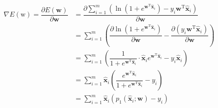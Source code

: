 \documentclass{article}
\begin{document}
\begin{equation*}
    \begin{aligned}
        \nabla E(\mathrm{w})=\dfrac{\partial E(\mathbf{w})}{\partial \mathbf{w}} & =\dfrac{\partial \sum_{i=1}^m\left(\ln \left(1+e^{\mathbf{w}^{\mathrm{T}} \hat{\boldsymbol{x}}_i}\right) - y_i \mathbf{w}^{\mathrm{T}} \hat{\boldsymbol{x}}_i\right)}{\partial \mathbf{w}} \\
        & =\sum_{i=1}^m\left(\dfrac{\partial \ln \left(1+e^{\mathbf{w}^{\mathrm{T}} \hat{\boldsymbol{x}}_i}\right)}{\partial \mathbf{w}}-\dfrac{\partial\left(y_i \mathbf{w}^{\mathrm{T}} \hat{\boldsymbol{x}}_i\right)}{\partial \mathbf{w}}\right) \\
        & =\sum_{i=1}^m\left(\dfrac{1}{1+e^{\mathbf{w}^{\mathrm{T}} \hat{\boldsymbol{x}}_i}} \cdot \hat{\boldsymbol{x}}_i e^{\mathbf{w}^{\mathrm{T}} \hat{\boldsymbol{x}}_i}-y_i \hat{\boldsymbol{x}}_i\right) \\
        & =\sum_{i=1}^m \hat{\boldsymbol{x}}_i\left(\dfrac{e^{\mathbf{w}^{\mathrm{T}} \hat{\boldsymbol{x}}_i}}{1+e^{\mathbf{w}^{\mathrm{T}} \hat{\boldsymbol{x}}_i}}-y_i\right) \\
        & =\sum_{i=1}^m \hat{\boldsymbol{x}}_i\left(p_1\left(\hat{\boldsymbol{x}}_i ; \mathbf{w}\right)-y_i\right)
    \end{aligned}
\end{equation*}
\end{document}
